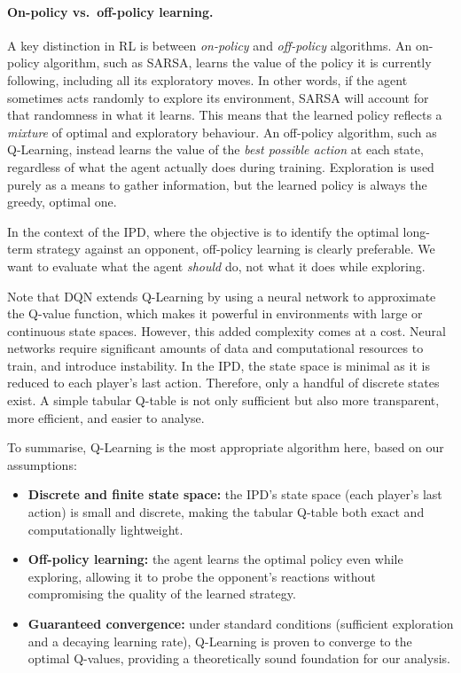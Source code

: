 \documentclass[11pt, a4paper]{article}
\begin{document}
\paragraph{On-policy vs.\ off-policy learning.}
A key distinction in RL is between \textit{on-policy} and \textit{off-policy}
algorithms. 
An on-policy algorithm, such as SARSA, learns the value of the policy it is
currently following, including all its exploratory moves. In other words, if the agent
sometimes acts randomly to explore its environment, SARSA will account for that randomness in
what it learns. This means that the learned policy reflects a \textit{mixture} of optimal and
exploratory behaviour. 
An off-policy algorithm, such as Q-Learning, instead learns the value
of the \textit{best possible action} at each state, regardless of what the agent actually does
during training. Exploration is used purely as a means to gather information, but the learned
policy is always the greedy, optimal one. 

In the context of the IPD, where the objective is to identify the optimal long-term strategy
against an opponent, off-policy learning is clearly preferable.
We want to evaluate what the agent \textit{should} do, not what it does while exploring.

Note that DQN extends Q-Learning by using a neural network to approximate the Q-value function, which
makes it powerful in environments with large or continuous state spaces. However, this added complexity comes at a cost.
Neural networks require significant amounts of data and computational resources to train, and introduce instability. 
In the IPD, the state space is minimal as it is reduced to each player's last action. Therefore, only
a handful of discrete states exist. A simple tabular Q-table is not only sufficient but also more
transparent, more efficient, and easier to analyse.


To summarise, Q-Learning is the most appropriate algorithm here, based on our assumptions:
\begin{itemize}
    \item \textbf{Discrete and finite state space:} the IPD's state space (each player's last
    action) is small and discrete, making the tabular Q-table both exact and computationally
    lightweight.

    \item \textbf{Off-policy learning:} the agent learns the optimal policy even while
    exploring, allowing it to probe the opponent's reactions without compromising the quality
    of the learned strategy.

    \item \textbf{Guaranteed convergence:} under standard conditions (sufficient exploration
    and a decaying learning rate), Q-Learning is proven to converge to the optimal Q-values,
    providing a theoretically sound foundation for our analysis.
\end{itemize}
\end{document}
